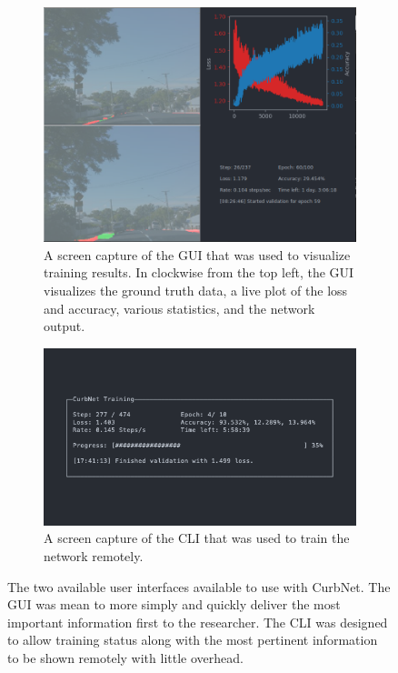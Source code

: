 \begin{figure}
	\centering
	\begin{subfigure}{0.45\textwidth}
		\includegraphics[width=\linewidth]{figures/experiments/gui.png}
		\caption[Training GUI]{A screen capture of the GUI that was used to visualize training results. In clockwise from the top left, the GUI visualizes the ground truth data, a live plot of the loss and accuracy, various statistics, and the network output.}
		\label{fig:experiments-gui}
	\end{subfigure}
	\hfill
	\begin{subfigure}{0.45\textwidth}
		\includegraphics[width=\linewidth]{figures/experiments/cli.png}
		\caption[Training CLI]{A screen capture of the CLI that was used to train the network remotely.}
		\label{fig:experiments-cli}
	\end{subfigure}
	\caption[Training UI]{The two available user interfaces available to use with CurbNet. The GUI was mean to more simply and quickly deliver the most important information first to the researcher. The CLI was designed to allow training status along with the most pertinent information to be shown remotely with little overhead.}
\end{figure}